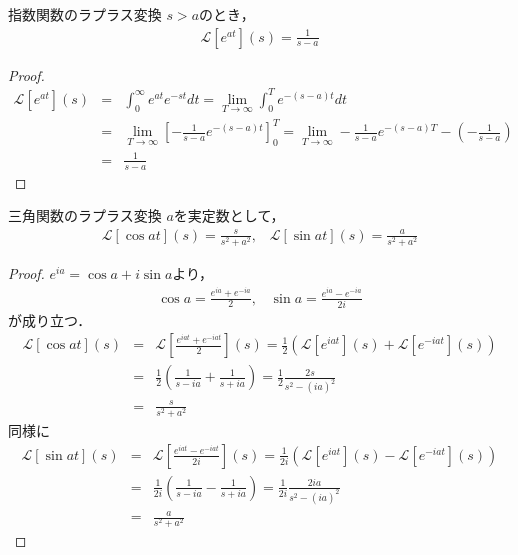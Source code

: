 \documentclass[uplatex, dvipdfmx, fleqn, a4paper, 10pt]{ujreport}
\begin{document}
\begin{exprbox}{指数関数のラプラス変換}
    $s > a$のとき，
    \begin{eqnarray}
        \mathcal{L}[e^{at}](s) = \frac{1}{s - a}
    \end{eqnarray}
    \begin{proof}
        \begin{eqnarray*}
            \mathcal{L}[e^{at}](s) &=& \int_{0}^{\infty} e^{at} e^{-st} dt
            = \lim_{T \to \infty} \int_{0}^{T} e^{-(s - a)t} dt \\
            &=& \lim_{T \to \infty} \left[-\frac{1}{s - a}e^{-(s - a)t}\right]_0^T 
            = \lim_{T \to \infty} -\frac{1}{s - a}e^{-(s - a)T} - \left(-\frac{1}{s - a}\right) \\
            &=& \frac{1}{s - a}
        \end{eqnarray*}
    \end{proof}
\end{exprbox}

\begin{exprbox}{三角関数のラプラス変換}
    $a$を実定数として，
    \begin{eqnarray}
        \mathcal{L}[\cos at](s) = \frac{s}{s^2 + a^2},\hspace{10pt}\mathcal{L}[\sin at](s) = \frac{a}{s^2 + a^2}
    \end{eqnarray}
    \begin{proof}
        $e^{ia} = \cos a + i\sin a$より，
        \begin{eqnarray}
            \cos a = \frac{e^{ia} + e^{-ia}}{2},\hspace{10pt}\sin a = \frac{e^{ia} - e^{-ia}}{2i}
        \end{eqnarray}
        が成り立つ．
        \begin{eqnarray*}
            \mathcal{L}[\cos at](s) &=& \mathcal{L}[\frac{e^{iat} + e^{-iat}}{2}](s)
            = \frac{1}{2}\left(\mathcal{L}[e^{iat}](s) + \mathcal{L}[e^{-iat}](s)\right)\\
            &=& \frac{1}{2} \left(\frac{1}{s - ia} + \frac{1}{s + ia}\right)
            = \frac{1}{2} \frac{2s}{s^2 - (ia)^2} \\
            &=& \frac{s}{s^2 + a^2}
        \end{eqnarray*}
        同様に
        \begin{eqnarray*}
            \mathcal{L}[\sin at](s) &=& \mathcal{L}[\frac{e^{iat} - e^{-iat}}{2i}](s)
            = \frac{1}{2i}\left(\mathcal{L}[e^{iat}](s) - \mathcal{L}[e^{-iat}](s)\right)\\
            &=& \frac{1}{2i} \left(\frac{1}{s - ia} - \frac{1}{s + ia}\right)
            = \frac{1}{2i} \frac{2ia}{s^2 - (ia)^2} \\
            &=& \frac{a}{s^2 + a^2}
        \end{eqnarray*}
    \end{proof}
\end{exprbox}
\end{document}
